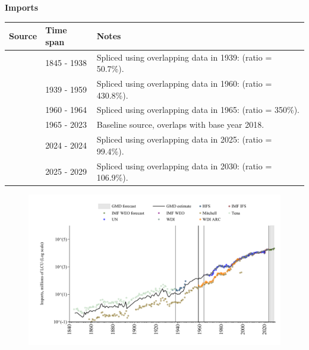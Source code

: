 \documentclass[12pt,a4paper,landscape]{article}
\begin{document}
\begin{adjustbox}{max totalsize={\paperwidth}{\paperheight},center}
\begin{minipage}[t][\textheight][t]{\textwidth}
\vspace*{0.5cm}
{}
\begin{center}
{\Large\bfseries Imports}
\end{center}
\vspace{0.5cm}
\begin{table}[H]
\centering
\small
\begin{tabular}{|l|l|l|}
\hline
\textbf{Source} & \textbf{Time span} & \textbf{Notes} \\
\hline
\rowcolor{white}\cite{Tena}& 1845 - 1938 &Spliced using overlapping data in 1939: (ratio = 50.7\%). \\
\rowcolor{lightgray}\cite{Mitchell}& 1939 - 1959 &Spliced using overlapping data in 1960: (ratio = 430.8\%). \\
\rowcolor{white}\cite{WDI_ARC}& 1960 - 1964 &Spliced using overlapping data in 1965: (ratio = 350\%). \\
\rowcolor{lightgray}\cite{WDI}& 1965 - 2023 &Baseline source, overlaps with base year 2018. \\
\rowcolor{white}\cite{IMF_IFS}& 2024 - 2024 &Spliced using overlapping data in 2025: (ratio = 99.4\%). \\
\rowcolor{lightgray}\cite{IMF_WEO_forecast}& 2025 - 2029 &Spliced using overlapping data in 2030: (ratio = 106.9\%). \\
\hline
\end{tabular}
\end{table}
\begin{figure}[H]
\centering
\includegraphics[width=\textwidth,height=0.6\textheight,keepaspectratio]{graphs/SLV_imports.pdf}
\end{figure}
\end{minipage}
\end{adjustbox}
\end{document}
